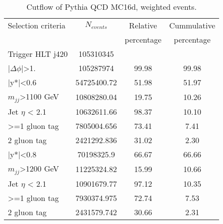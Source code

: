 \begin{table}[ht]
\begin{center}
\begin{tabular}{|l|c|c|c|}
\hline
Selection criteria & $N_{events}$ & Relative & Cummulative  \\
 & & percentage & percentage \\
\hline
Trigger HLT j420 & 105310345 &  &  \\
$|\Delta\phi|$>1. & 105287974 & 99.98 & 99.98 \\
\hline\hline
|y*|<0.6 & 54725400.72 & 51.98 & 51.97 \\
$m_{jj}$>1100 GeV & 10808280.04 & 19.75 & 10.26 \\
Jet $\eta$ < 2.1 & 10632611.66 & 98.37 & 10.10 \\
>=1 gluon tag & 7805004.656 & 73.41 & 7.41 \\
2 gluon tag & 2421292.836 & 31.02 & 2.30 \\
\hline\hline
|y*|<0.8 & 70198325.9 & 66.67 & 66.66 \\
$m_{jj}$>1200 GeV & 11225324.82 & 15.99 & 10.66 \\
Jet $\eta$ < 2.1 & 10901679.77 & 97.12 & 10.35 \\
>=1 gluon tag & 7930374.975 & 72.74 & 7.53 \\
2 gluon tag & 2431579.742 & 30.66 & 2.31 \\
\hline
\end{tabular}
\end{center}
\caption{Cutflow of Pythia QCD MC16d, weighted events.}
\end{table}

